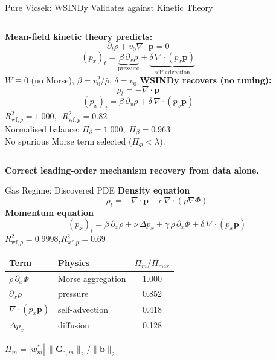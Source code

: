 \begin{frame}[shrink=10]{Pure Vicsek: WSINDy Validates against Kinetic Theory}
\begin{columns}[T]
\textbf{Mean-field kinetic theory predicts:}
\[
  \partial_t\rho + v_0\nabla\!\cdot\mathbf{p} = 0
\]
\[
  (p_x)_t = \underbrace{\beta\,\partial_x\rho}_{\text{pressure}}
           + \underbrace{\delta\,\nabla\!\cdot(p_x\mathbf{p})}_{\text{self-advection}}
\]
{\small $W\equiv 0$ (no Morse), $\beta=v_0^2/\bar\rho$, $\delta=v_0$}
\textbf{WSINDy recovers (no tuning):}
\[
  \rho_t = -\nabla\!\cdot\mathbf{p}
\]
\[
  (p_x)_t = \beta\,\partial_x\rho + \delta\,\nabla\!\cdot(p_x\mathbf{p})
\]
{\small $R^2_{\mathrm{wf},\rho}=1.000,\enspace R^2_{\mathrm{wf},p}=0.82$}\\[0.3em]
{\small Normalised balance: $\Pi_{\delta}=1.000,\;\Pi_{\beta}=0.963$}\\[0.1em]
{\small No spurious Morse term selected ($\Pi_{\Phi}<\lambda$).}
\end{columns}
\centering\medskip\large\textbf{Correct leading-order mechanism recovery from data alone.}
\end{frame}

\begin{frame}[shrink=4]{Gas Regime: Discovered PDE}
\large\centering
\textbf{Density equation}
\[
  \rho_t = -\nabla\!\cdot\mathbf{p} - c\,\nabla\!\cdot(\rho\nabla\Phi)
\]
\textbf{Momentum equation}
\[
  (p_x)_t = \beta\,\partial_x\rho + \nu\,\Delta p_x + \gamma\,\rho\,\partial_x\Phi + \delta\,\nabla\!\cdot(p_x\mathbf{p})
\]
\normalsize\medskip
$R^2_{\mathrm{wf},\rho}=0.9998$,\quad $R^2_{\mathrm{wf},p}=0.69$\\[0.3em]
\small\renewcommand{\arraystretch}{1.2}
\begin{tabular}{llc}
\toprule
\textbf{Term} & \textbf{Physics} & $\Pi_m/\Pi_{\max}$ \\
\midrule
$\rho\,\partial_x\Phi$ & Morse aggregation & 1.000 \\
$\partial_x\rho$ & pressure & 0.852 \\
$\nabla\!\cdot(p_x\mathbf{p})$ & self-advection & 0.418 \\
$\Delta p_x$ & diffusion & 0.128 \\
\bottomrule
\end{tabular}\quad
{\small $\Pi_m = |w_m^*|\,\|\mathbf{G}_{:,m}\|_2/\|\mathbf{b}\|_2$}
\end{frame}


